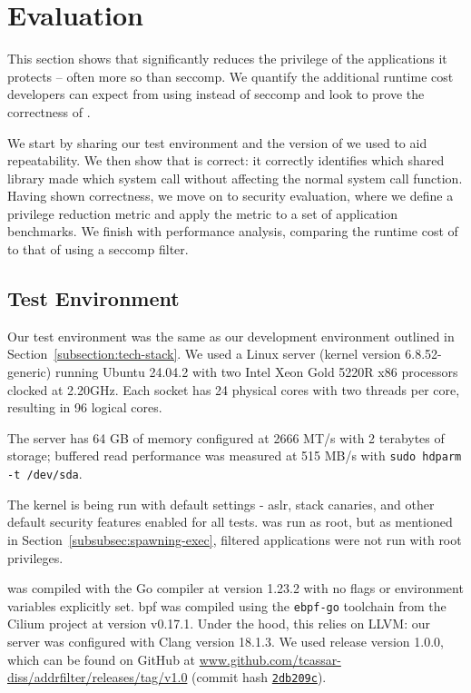 \section{Evaluation}\label{sec:evaluation}

\iffalse
    Gavin wants to see:
    - What is the max privilege score that an application can have?
    - Diagram about system call distribution
\fi

This section shows that \af significantly reduces the
privilege of the applications it protects -- often more so than seccomp. 
We quantify the additional runtime cost developers can expect from using 
\af instead of seccomp and look to prove the correctness of \af.

We start by sharing our test environment and the version of \af we used to
aid repeatability. We then show that \af is correct: it correctly identifies which shared library made which system call without
affecting the normal system call function. Having shown correctness, we move on to
security evaluation, where we define a privilege reduction metric and apply the
metric to a set of application benchmarks. We finish with performance analysis,
comparing the runtime cost of \af to that of using a seccomp filter.

\subsection{Test Environment}

Our test environment was the same as our development environment outlined in
Section~\ref{subsection:tech-stack}. We used a Linux server (kernel version
6.8.52-generic) running Ubuntu 24.04.2 with two Intel Xeon
Gold 5220R x86 processors clocked at 2.20GHz. Each socket has 24 physical 
cores with two threads per core, resulting in 96 logical cores.

The server has 64 GB of memory configured at 2666 MT/s with 2 terabytes
of storage; buffered read performance was measured at 515 MB/s with 
\texttt{sudo hdparm -t /dev/sda}.

The kernel is being run with default settings - \ac{aslr}, stack
canaries, and other default security features enabled for all tests.
\af was run as root, but as mentioned in Section~\ref{subsubsec:spawning-exec},
filtered applications were not run with root privileges.

\af was compiled with the Go compiler at version 1.23.2 with no flags or
environment variables explicitly set. \ac{bpf} was
compiled using the \texttt{ebpf-go} toolchain from the Cilium project at version
v0.17.1. Under the hood, this relies on LLVM: our server was configured with
Clang version 18.1.3. We used \af release version 1.0.0, which can be found on
GitHub at
\href{https://github.com/tcassar-diss/addrfilter/releases/tag/v1.0}
{www.github.com/tcassar-diss/addrfilter/releases/tag/v1.0}
(commit hash 
\href{https://github.com/tcassar-diss/addrfilter/tree/2bd209c630df3509d4ac721d018dabab94305dde}
{\texttt{2db209c}}).

